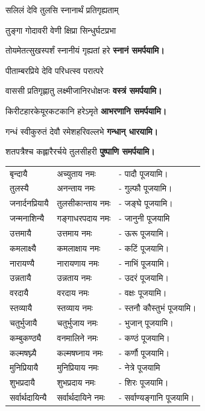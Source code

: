 \begin{center}
{सलिलं देवि तुलसि स्नानार्थं प्रतिगृह्यताम्}

{तुङ्गा गोदावरी वेणी क्षिप्रा सिन्धुर्घटप्रभा}

{तोयमेतत्सुखस्पर्शं स्नानीयं गृह्यतां हरे}
\textbf{\devAya{} स्नानं समर्पयामि।}
\medskip

{पीताम्बरप्रिये देवि परिधत्स्व परात्परे}

{वाससी प्रतिगृह्णातु लक्ष्मीजानिरधोक्षजः}
\textbf{\devAya{} वस्त्रं समर्पयामि।}
\medskip

{किरीटहारकेयूरकटकानि हरेऽमृते}
\textbf{\devAya{} आभरणानि समर्पयामि।}
\medskip

{गन्धं स्वीकुरुतं देवौ रमेशहरिवल्लभे}
\textbf{\devAya{} गन्धान् धारयामि।}
\medskip

{शतपत्रैश्च कह्लारैरर्चये तुलसीहरी}
\textbf{\devAya{} पुष्पाणि समर्पयामि।}
\medskip


\begin{tabular}{ll@{}l}
बृन्दायै & अच्युताय नमः & - पादौ पूजयामि।\\
तुलस्यै & अनन्ताय नमः &- गुल्फौ पूजयामि।\\
जनार्दनप्रियायै & तुलसीकान्ताय नमः & - जङ्घे पूजयामि।\\
जन्मनाशिन्यै & गङ्गाधरपदाय नमः & - जानुनी पूजयामि\\
उत्तमायै & उत्तमाय नमः & - ऊरू पूजयामि।\\
कमलाक्ष्यै & कमलाक्षाय नमः & - कटिं पूजयामि।\\
नारायण्यै & नारायणाय नमः & - नाभिं पूजयामि।\\
उन्नतायै & उन्नताय नमः & - उदरं पूजयामि।\\
वरदायै & वरदाय नमः & - वक्षः पूजयामि।\\
स्तव्यायै & स्तव्याय नमः & - स्तनौ कौस्तुभं पूजयामि।\\
चतुर्भुजायै & चतुर्भुजाय नमः & - भुजान् पूजयामि।\\
कम्बुकण्ठ्यै & वनमालिने नमः & - कण्ठं पूजयामि।\\
कल्मषघ्न्यै & कल्मषघ्नाय नमः & - कर्णौ पूजयामि।\\
मुनिप्रियायै & मुनिप्रियाय नमः & - नेत्रे पूजयामि\\
शुभप्रदायै & शुभप्रदाय नमः & - शिरः पूजयामि।\\
सर्वार्थदायिन्यै & सर्वार्थदायिने नमः & - सर्वाण्यङ्गानि पूजयामि।\\
\end{tabular}


\end{center}

